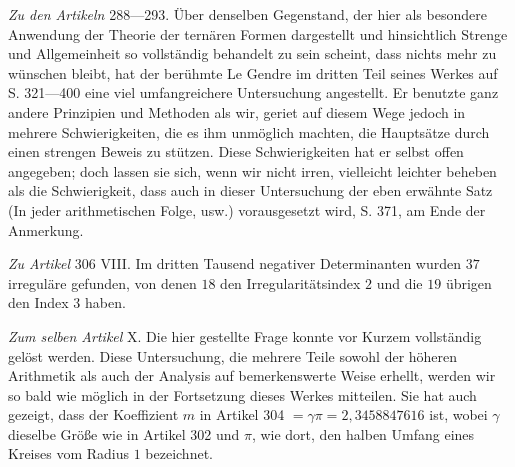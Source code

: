 \textit{Zu den Artikeln} 288---293. Über denselben Gegenstand, der hier als besondere Anwendung der Theorie der ternären Formen dargestellt und hinsichtlich Strenge und Allgemeinheit so vollständig behandelt zu sein scheint, dass nichts mehr zu wünschen bleibt, hat der berühmte Le Gendre im dritten Teil seines Werkes auf S. 321---400 eine viel umfangreichere Untersuchung angestellt. Er benutzte ganz andere Prinzipien und Methoden als wir, geriet auf diesem Wege jedoch in mehrere Schwierigkeiten, die es ihm unmöglich machten, die Hauptsätze durch einen strengen Beweis zu stützen. Diese Schwierigkeiten hat er selbst offen angegeben; doch lassen sie sich, wenn wir nicht irren, vielleicht leichter beheben als die Schwierigkeit, dass auch in dieser Untersuchung der eben erwähnte Satz (In jeder arithmetischen Folge, usw.) vorausgesetzt wird, S. 371, am Ende der Anmerkung.

\textit{Zu Artikel} 306 VIII. Im dritten Tausend negativer Determinanten wurden \(37\) irreguläre gefunden, von denen \(18\) den Irregularitätsindex \(2\) und die \(19\) übrigen den Index \(3\) haben.

\clearpage\textit{Zum selben Artikel} X. Die hier gestellte Frage konnte vor Kurzem vollständig gelöst werden. Diese Untersuchung, die mehrere Teile sowohl der höheren Arithmetik als auch der Analysis auf bemerkenswerte Weise erhellt, werden wir so bald wie möglich in der Fortsetzung dieses Werkes mitteilen. Sie hat auch gezeigt, dass der Koeffizient \(m\) in Artikel 304 \(=\gamma\pi=2{,}3458847616\) ist, wobei \(\gamma\) dieselbe Größe wie in Artikel 302 und \(\pi\), wie dort, den halben Umfang eines Kreises vom Radius \(1\) bezeichnet.



